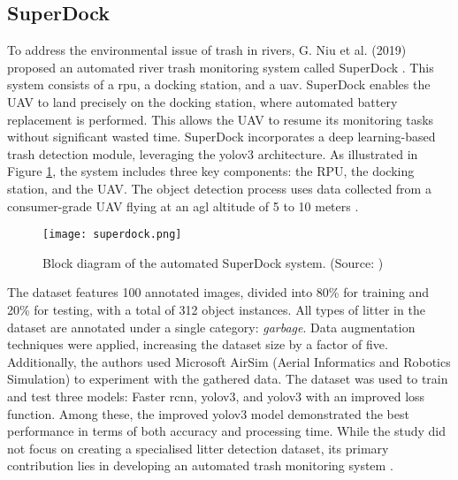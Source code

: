 \subsection{SuperDock}
\label{subsec:3_superdock}

To address the environmental issue of trash in rivers, G. Niu et al. (2019) proposed an automated river trash monitoring system called SuperDock \cite{superdock}. This system consists of a \gls{rpu}, a docking station, and a \gls{uav}. SuperDock enables the UAV to land precisely on the docking station, where automated battery replacement is performed. This allows the UAV to resume its monitoring tasks without significant wasted time. SuperDock incorporates a deep learning-based trash detection module, leveraging the \gls{yolo}v3 architecture. As illustrated in Figure \ref{fig:superdock}, the system includes three key components: the RPU, the docking station, and the UAV. The object detection process uses data collected from a consumer-grade UAV flying at an \gls{agl} altitude of 5 to 10 meters \cite{superdock}.

\begin{figure}[!htbp]
    \centering
    \texttt{[image: superdock.png]}
    \caption{Block diagram of the automated SuperDock system. (Source: \cite{superdock})}
    \label{fig:superdock}
\end{figure}

The dataset features 100 annotated images, divided into 80\% for training and 20\% for testing, with a total of 312 object instances. All types of litter in the dataset are annotated under a single category: \textit{garbage}. Data augmentation techniques were applied, increasing the dataset size by a factor of five. Additionally, the authors used Microsoft AirSim (Aerial Informatics and Robotics Simulation) to experiment with the gathered data. The dataset was used to train and test three models: Faster \gls{rcnn}, \gls{yolo}v3, and \gls{yolo}v3 with an improved loss function. Among these, the improved \gls{yolo}v3 model demonstrated the best performance in terms of both accuracy and processing time. While the study did not focus on creating a specialised litter detection dataset, its primary contribution lies in developing an automated trash monitoring system \cite{superdock}.

